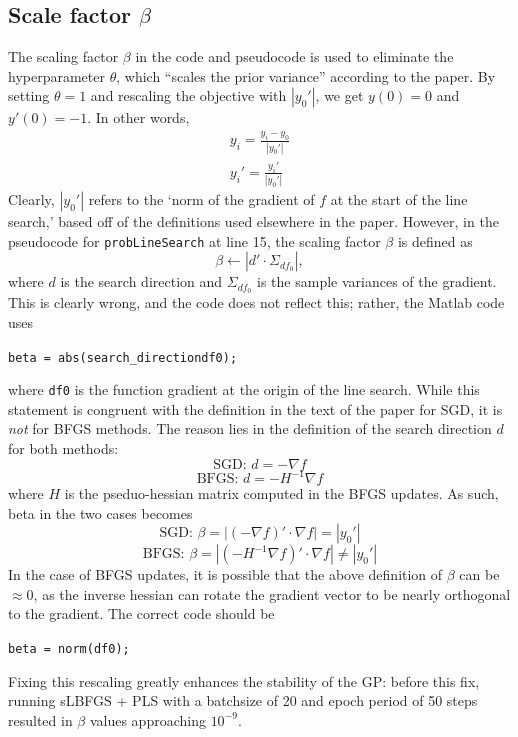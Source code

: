 \documentclass{article}
\begin{document}
\subsection{Scale factor $\beta$}
The scaling factor $\beta$ in the code and pseudocode is used to eliminate the hyperparameter $\theta$, which ``scales the prior variance'' according to the paper. By setting $\theta=1$ and rescaling the objective with $|y_0'|$, we get $y(0)=0$ and $y'(0)=-1$. In other words,
\begin{gather}
\label{eq:y_scaling} y_i = \frac{y_i - y_0}{|y_0'|} \\
\label{eq:dy_scaling} y_i' = \frac{y_i'}{|y_0'|}
\end{gather}
Clearly, $|y_0'|$ refers to the `norm of the gradient of $f$ at the start of the line search,' based off of the definitions used elsewhere in the paper. However, in the pseudocode for \texttt{probLineSearch} at line 15, the scaling factor $\beta$ is defined as
\[ \beta \leftarrow |d'\cdot \Sigma_{df_0}|,\]
where $d$ is the search direction and $\Sigma_{df_0}$ is the sample variances of the gradient. This is clearly wrong, and the code does not reflect this; rather, the Matlab code uses
\begin{center}
\texttt{beta = abs(search\_direction\textprime*df0);}
\end{center}
where \texttt{df0} is the function gradient at the origin of the line search. While this statement is congruent with the definition in the text of the paper for SGD, it is \emph{not} for BFGS methods. The reason lies in the definition of the search direction $d$ for both methods:
\[ \text{SGD: } d=-\nabla f \]
\[\text{BFGS: } d=-H^{-1}\nabla f \]
where $H$ is the pseduo-hessian matrix computed in the BFGS updates. As such, beta in the two cases becomes
\[ \text{SGD: } \beta=|(-\nabla f)' \cdot \nabla f | = |y_0'|\]
\[\text{BFGS: } \beta=|(-H^{-1}\nabla f)' \cdot \nabla f| \neq |y_0'| \]
In the case of BFGS updates, it is possible that the above definition of $\beta$ can be $\approx 0$, as the inverse hessian can rotate the gradient vector to be nearly orthogonal to the gradient. The correct code should be 
\begin{center}
\texttt{beta = norm(df0);}
\end{center}
Fixing this rescaling greatly enhances the stability of the GP: before this fix, running sLBFGS + PLS with a batchsize of 20 and epoch period of 50 steps resulted in $\beta$ values approaching $10^{-9}$.
\end{document}
